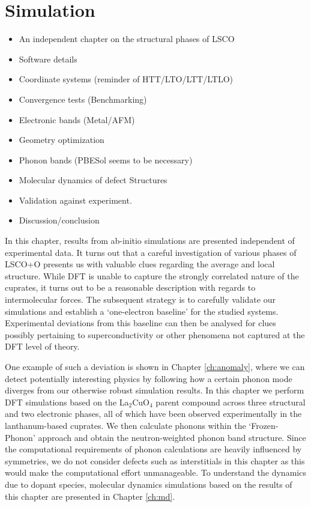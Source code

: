 \chapter{Simulation}\label{ch:simulation}

\begin{framed}
	\begin{itemize}
		\item An independent chapter on the structural phases of LSCO
		\item Software details
		\item Coordinate systems (reminder of HTT/LTO/LTT/LTLO)
		\item Convergence tests (Benchmarking)
		\item Electronic bands (Metal/AFM)
		\item Geometry optimization
		\item Phonon bands (PBESol seems to be necessary)
		\item Molecular dynamics of defect Structures
		\item Validation against experiment.
		\item Discussion/conclusion
	\end{itemize}	
\end{framed}

In this chapter, results from ab-initio simulations are presented independent of experimental data. It turns out that a careful investigation of various phases of LSCO+O presents us with valuable clues regarding the average and local structure. While DFT is unable to capture the strongly correlated nature of the cuprates, it turns out to be a reasonable description with regards to intermolecular forces. The subsequent strategy is to carefully validate our simulations and establish a `one-electron baseline' for the studied systems. Experimental deviations from this baseline can then be analysed for clues possibly pertaining to superconductivity or other phenomena not captured at the DFT level of theory.

One example of such a deviation is shown in Chapter \ref{ch:anomaly}, where we can detect potentially interesting physics by following how a certain phonon mode diverges from our otherwise robust simulation results. In this chapter we perform DFT simulations based on the La$_2$CuO$_4$ parent compound across three structural and two electronic phases, all of which have been observed experimentally in the lanthanum-based cuprates. We then calculate phonons within the `Frozen-Phonon' approach and obtain the neutron-weighted phonon band structure. Since the computational requirements of phonon calculations are heavily influenced by symmetries, we do not consider defects such as interstitials in this chapter as this would make the computational effort unmanageable. To understand the dynamics due to dopant species, molecular dynamics simulations based on the results of this chapter are presented in Chapter \ref{ch:md}.

